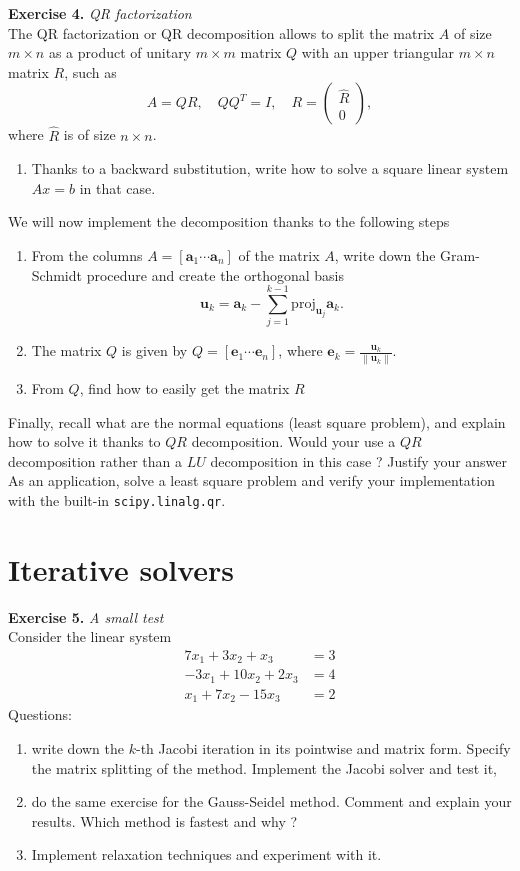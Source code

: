 \documentclass{article}
\begin{document}
\vspace{0.5cm}
\noindent \textbf{Exercise 4.} \textit{QR factorization} \\
The QR factorization or QR decomposition allows to split the matrix $A$ of size $m \times n$ as a product of unitary $m \times m$ matrix $Q$ with an upper triangular $m \times n$ matrix $R$, such as
$$ A = QR, \quad QQ^T = I, \quad R = \begin{pmatrix} \hat{R} \\ 0 \end{pmatrix}, $$
where $\hat{R}$ is of size $n \times n$.
\begin{enumerate}
    \item Thanks to a backward substitution, write how to solve a square linear system $Ax=b$ in that case.
\end{enumerate}
We will now implement the decomposition thanks to the following steps
\begin{enumerate}
    \item From the columns $A = [\textbf{a}_1 \cdots \textbf{a}_n]$ of the matrix $A$, write down the Gram-Schmidt procedure and create the orthogonal basis 
    $$
    \textbf{u}_k = \textbf{a}_k - \sum_{j=1}^{k-1} \text{proj}_{\textbf{u}_j} \textbf{a}_k.
    $$
    \item The matrix $Q$ is given by $Q = [\textbf{e}_1 \cdots \textbf{e}_n]$, where $\textbf{e}_k = \frac{\textbf{u}_k}{\left\| \textbf{u}_k \right\|}$. 
    \item From $Q$, find how to easily get the matrix $R$
\end{enumerate}
Finally, recall what are the normal equations (least square problem), and explain how to solve it thanks to $QR$ decomposition. Would your use a $QR$ decomposition rather than a $LU$ decomposition in this case ? Justify your answer \\
As an application, solve a least square problem and verify your implementation with the built-in \texttt{scipy.linalg.qr}.

\section*{Iterative solvers}
\noindent \textbf{Exercise 5.} \textit{A small test} \\
Consider the linear system
\begin{align*}
    7 x_1 + 3 x_2 + x_3 &= 3 \\
    -3 x_1 + 10x_2 + 2 x_3 &= 4 \\
    x_1 + 7x_2 -15x_3 &= 2
\end{align*}
Questions: 
\begin{enumerate}
    \item write down the $k$-th Jacobi iteration in its pointwise and matrix form. Specify the matrix splitting of the method. Implement the Jacobi solver and test it, 
    \item do the same exercise for the Gauss-Seidel method.
Comment and explain your results. Which method is fastest and why ?
 \item Implement relaxation techniques and experiment with it. 
\end{enumerate}
\end{document}
